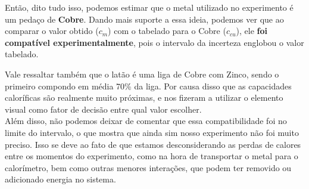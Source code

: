 Então, dito tudo isso, podemos estimar que o metal utilizado no experimento é um pedaço de \textbf{Cobre}. Dando mais suporte a essa ideia, podemos ver que ao comparar o valor obtido ($c_m$) com o tabelado para o Cobre ($c_{cu}$), ele \textbf{foi compatível experimentalmente}, pois o intervalo da incerteza englobou o valor tabelado.

Vale ressaltar também que o latão é uma liga de Cobre com Zinco, sendo o primeiro compondo em média 70\% da liga. Por causa disso que as capacidades caloríficas são realmente muito próximas, e nos fizeram a utilizar o elemento visual como fator de decisão entre qual valor escolher.\\

Além disso, não podemos deixar de comentar que essa compatibilidade foi no limite do intervalo, o que mostra que ainda sim nosso experimento não foi muito preciso. Isso se deve ao fato de que estamos desconsiderando as perdas de calores entre os momentos do experimento, como na hora de transportar o metal para o calorímetro, bem como outras menores interações, que podem ter removido ou adicionado energia no sistema.
